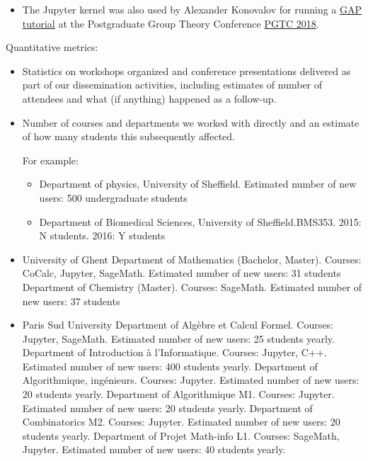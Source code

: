 \begin{Aim 1}
\begin{Aim 2}
\begin{itemize}
     \item The \GAP Jupyter kernel was also used by Alexander Konovalov for running a \href{https://github.com/alex-konovalov/gap-teaching
     /}{GAP tutorial} at the Postgraduate Group Theory Conference \href{http://www-groups.mcs.st-and.ac.uk/~pgtc2018/}{PGTC 2018}.
     \end{itemize}



Quantitative metrics:
\begin{itemize}
\item Statistics on workshops organized and conference presentations delivered as part of our dissemination activities, including estimates of number of attendees and what (if anything) happened as a follow-up.
\item Number of courses and departments we worked with directly and an estimate of how many students this subsequently affected.

  For example:
  \begin{itemize}
  \item Department of physics, University of Sheffield. Estimated number of new users: 500 undergraduate students
  \item Department of Biomedical Sciences, University of Sheffield.BMS353. 2015: N students. 2016: Y students
  \end{itemize}
\end{itemize}

\begin{itemize}
  \item University of Ghent
  Department of Mathematics (Bachelor, Master). Courses: CoCalc, Jupyter, SageMath. Estimated number of new users: 31 students
  Department of Chemistry (Master). Courses: SageMath. Estimated number of new users: 37 students
  
  \item Paris Sud University 
  Department of Algèbre et Calcul Formel. Courses: Jupyter, SageMath. Estimated number of new users: 25 students yearly.
  Department of Introduction à l'Informatique. Courses: Jupyter, C++. Estimated number of new users: 400 students yearly.
  Department of Algorithmique, ingénieurs. Courses: Jupyter. Estimated number of new users: 20 students yearly.
  Department of Algorithmique M1. Courses: Jupyter. Estimated number of new users: 20 students yearly.
  Department of Combinatorics M2. Courses: Jupyter. Estimated number of new users: 20 students yearly.
  Department of Projet Math-info L1. Courses: SageMath, Jupyter. Estimated number of new users: 40 students yearly.
  

\end{itemize}
\end{Aim 2}
\end{Aim 1}
